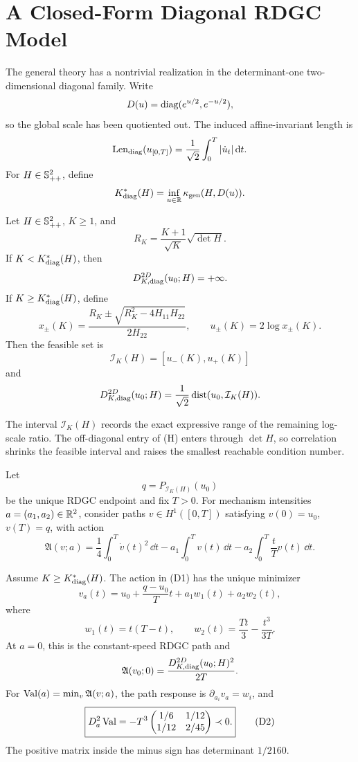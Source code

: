 \section{A Closed-Form Diagonal RDGC Model}
\label{sec:diagonal-model}

The general theory has a nontrivial realization in the determinant-one
two-dimensional diagonal family.  Write
\[
  D(u)=\operatorname{diag}(e^{u/2},e^{-u/2}),
\]
so the global scale has been quotiented out.  The induced affine-invariant
length is
\[
  \operatorname{Len}_{\operatorname{diag}}(u_{[0,T]})
  =
  \frac{1}{\sqrt2}\int_0^T|\dot u_t|\,\mathrm d t.
\]
For \(H\in\mathbb S_{++}^2\), define
\[
  K_{\operatorname{diag}}^\ast(H)
  =\inf_{u\in\mathbb R}\kappa_{\rm gen}(H,D(u)).
\]

\begin{theorem}
\label{thm:2d-diag}
Let \(H\in\mathbb S_{++}^2\), \(K\ge1\), and
\[
  R_K=\frac{K+1}{\sqrt K}\sqrt{\det H}.
\]
If \(K<K_{\operatorname{diag}}^\ast(H)\), then
\[
  D_{K,\operatorname{diag}}^{2D}(u_0;H)=+\infty.
\]
If \(K\ge K_{\operatorname{diag}}^\ast(H)\), define
\[
  x_\pm(K)
  =
  \frac{R_K\pm\sqrt{R_K^2-4H_{11}H_{22}}}{2H_{22}},
  \qquad
  u_\pm(K)=2\log x_\pm(K).
\]
Then the feasible set is
\[
  \mathcal I_K(H)=[u_-(K),u_+(K)]
\]
and
\[
  D_{K,\operatorname{diag}}^{2D}(u_0;H)
  =
  \frac{1}{\sqrt2}\operatorname{dist}(u_0,\mathcal I_K(H)).
\]
\end{theorem}

The interval \(\mathcal I_K(H)\) records the exact expressive range of the
remaining log-scale ratio.  The off-diagonal entry of (H) enters through
\(\det H\), so correlation shrinks the feasible interval and raises the
smallest reachable condition number.

Let
\[
  q=P_{\mathcal I_K(H)}(u_0)
\]
be the unique RDGC endpoint and fix \(T>0\).  For mechanism intensities
\(a=(a_1,a_2)\in\mathbb R^2\), consider paths \(v\in H^1([0,T])\) satisfying
\(v(0)=u_0\), \(v(T)=q\), with action
\begin{equation}
  \mathfrak A(v;a)
  =\frac14\int_0^T\dot v(t)^2\,\dd t
  -a_1\int_0^T v(t)\,\dd t
  -a_2\int_0^T\frac{t}{T}v(t)\,\dd t.
  \tag{D1}
\end{equation}

\begin{theorem}
\label{thm:diag-forced-response}
Assume \(K\ge K_{\operatorname{diag}}^\ast(H)\).  The action in \textup{(D1)} has the
unique minimizer
\[
  v_a(t)
  =u_0+\frac{q-u_0}{T}t+a_1w_1(t)+a_2w_2(t),
\]
where
\[
  w_1(t)=t(T-t),
  \qquad
  w_2(t)=\frac{Tt}{3}-\frac{t^3}{3T}.
\]
At \(a=0\), this is the constant-speed RDGC path and
\[
  \mathfrak A(v_0;0)
  =\frac{D_{K,\operatorname{diag}}^{2D}(u_0;H)^2}{2T}.
\]
For \(\operatorname{Val}(a)=\min_v\mathfrak A(v;a)\), the path response is
\(\partial_{a_i}v_a=w_i\), and
\begin{equation}
  \boxed{
  D_a^2\operatorname{Val}
  =-T^3
  \begin{pmatrix}
    1/6 & 1/12\\
    1/12 & 2/45
  \end{pmatrix}\prec0.}
  \tag{D2}
\end{equation}
The positive matrix inside the minus sign has determinant \(1/2160\).
\end{theorem}

